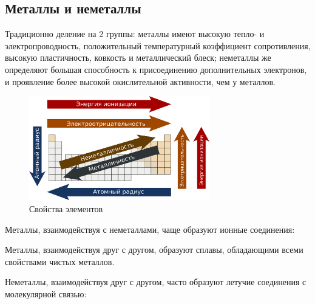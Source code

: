  \subsection{Металлы и неметаллы}
 
Традиционно деление на 2 группы: металлы имеют высокую тепло- и электропроводность, положительный температурный коэффициент сопротивления, высокую пластичность, ковкость и металлический блеск; неметаллы же определяют большая способность к присоединению дополнительных электронов, и проявление более высокой окислительной активности, чем у металлов.

\begin{figure}[H]
    \centering
    \includegraphics[width = 0.7\textwidth]{Pictures/2_properties.png}
    \caption{Свойства элементов}
    \label{fig:2properties}
\end{figure}

Металлы, взаимодействуя с неметаллами, чаще образуют ионные соединения:


Металлы, взаимодействуя друг с другом, образуют сплавы, обладающими всеми свойствами чистых металлов.

Неметаллы, взаимодействуя друг с другом, часто образуют летучие соединения с молекулярной связью:


